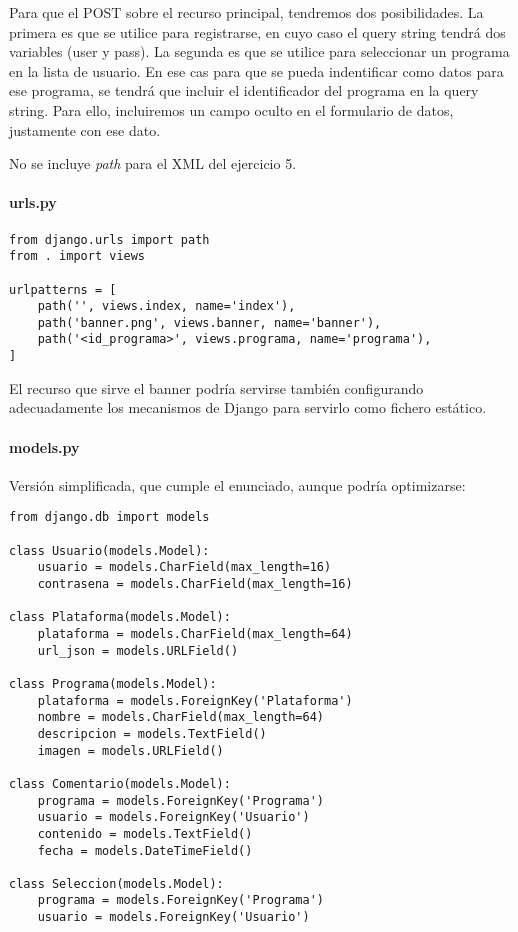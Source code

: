 Para que el POST sobre el recurso principal, tendremos dos posibilidades. La primera es que se utilice para registrarse, en cuyo caso el query string tendrá dos variables (user y pass). La segunda es que se utilice para seleccionar un programa en la lista de usuario. En ese cas para que
se pueda indentificar como datos para ese programa, se tendrá que incluir
el identificador del programa en la query string. Para ello, incluiremos
un campo oculto en el formulario de datos, justamente con ese dato.

No se incluye \emph{path} para el XML del ejercicio 5.

\paragraph{urls.py}


\begin{verbatim}
from django.urls import path
from . import views

urlpatterns = [
    path('', views.index, name='index'),
    path('banner.png', views.banner, name='banner'),
    path('<id_programa>', views.programa, name='programa'),
]
\end{verbatim}

El recurso que sirve el banner podría servirse también configurando
adecuadamente los mecanismos de Django para servirlo como fichero estático.

\paragraph{models.py}

Versión simplificada, que cumple el enunciado, aunque podría optimizarse:

\begin{verbatim}
from django.db import models

class Usuario(models.Model):
    usuario = models.CharField(max_length=16)
    contrasena = models.CharField(max_length=16)

class Plataforma(models.Model):
    plataforma = models.CharField(max_length=64)
    url_json = models.URLField()

class Programa(models.Model):
    plataforma = models.ForeignKey('Plataforma')
    nombre = models.CharField(max_length=64)
    descripcion = models.TextField()
    imagen = models.URLField()

class Comentario(models.Model):
    programa = models.ForeignKey('Programa')
    usuario = models.ForeignKey('Usuario')
    contenido = models.TextField()
    fecha = models.DateTimeField()
    
class Seleccion(models.Model):
    programa = models.ForeignKey('Programa')
    usuario = models.ForeignKey('Usuario')

    
\end{verbatim}


